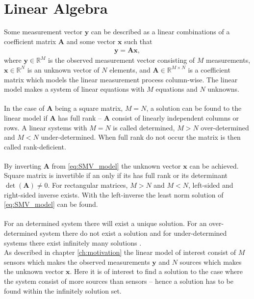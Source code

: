 \section{Linear Algebra}
Some measurement vector $\mathbf{y}$ can be described as a linear combinations of a coefficient matrix $\mathbf{A}$ and some vector $\mathbf{x}$ such that
\begin{align}\label{eq:SMV_model}
\mathbf{y} = \mathbf{Ax},
\end{align}
where $\mathbf{y} \in \mathbb{R}^M$ is the observed measurement vector consisting of $M$ measurements, $\mathbf{x} \in \mathbb{R}^N$ is an unknown vector of $N$ elements, and $\mathbf{A} \in \mathbb{R}^{M \times N}$ is a coefficient matrix which models the linear measurement process column-wise. 
The linear model makes a system of linear equations with $M$ equations and $N$ unknowns.
\\ \\
In the case of $\mathbf{A}$ being a square matrix, $M = N$, a solution can be found to the linear model if $\mathbf{A}$ has full rank -- $\mathbf{A}$ consist of linearly independent columns or rows.
A linear systems with $M = N$ is called determined, $M > N$ over-determined and $M < N$ under-determined. 
When full rank do not occur the matrix is then called rank-deficient.
\\ \\
By inverting $\mathbf{A}$ from \eqref{eq:SMV_model} the unknown vector $\mathbf{x}$ can be achieved. 
Square matrix is invertible if an only if its has full rank or its determinant $\det(\mathbf{A}) \neq 0$. 
For rectangular matrices, $M > N$ and $M < N$, left-sided and right-sided inverse exists.
With the left-inverse the least norm solution of \eqref{eq:SMV_model} can be found.
\\ \\
For an determined system there will exist a unique solution.
For an over-determined system there do not exist a solution and for under-determined systems there exist infinitely many solutions \cite[p. ix]{CS}.
\\ 
As described in chapter \ref{ch:motivation} the linear model of interest consist of $M$ sensors which makes the observed measurements $\textbf{y}$ and $N$ sources which makes the unknown vector $\textbf{x}$. 
Here it is of interest to find a solution to the case where the system consist of more sources than sensors -- hence a solution has to be found within the infinitely solution set.

